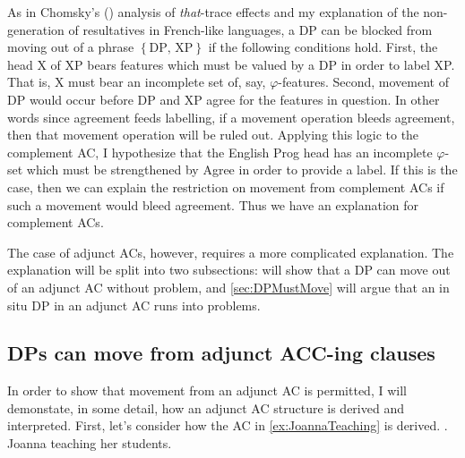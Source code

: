 \documentclass[MilwayThesis]{subfiles}
\begin{document}
As in Chomsky's (\citeyear{chomsky2015problems}) analysis of \textit{that}-trace effects and my explanation of the non-generation of resultatives in French-like languages, a DP can be blocked from moving out of a phrase $\left\{ \text{DP, XP} \right\}$ if the following conditions hold.
First, the head X of XP bears features which must be valued by a DP in order to label XP.
That is, X must bear an incomplete set of, say, $\varphi$-features.
Second, movement of DP would occur before DP and XP agree for the features in question.
In other words since agreement feeds labelling, if a movement operation bleeds agreement, then that movement operation will be ruled out.
Applying this logic to the complement AC, I hypothesize that the English Prog head has an incomplete $\varphi$-set which must be strengthened by Agree in order to provide a label.
If this is the case, then we can explain the restriction on movement from complement ACs if such a movement would bleed agreement.
Thus we have an explanation for complement ACs.

The case of adjunct ACs, however, requires a more complicated explanation.
The explanation will be split into two subsections:  will show that a DP can move out of an adjunct AC without problem, and \cref{sec:DPMustMove} will argue that an in situ DP in an adjunct AC runs into problems.

\subsection{DPs can move from adjunct ACC-ing clauses}\label{sec:DPCanMove}
In order to show that movement from an adjunct AC is permitted, I will demonstate, in some detail, how an adjunct AC structure is derived and interpreted.
First, let's consider how the AC in \cref{ex:JoannaTeaching} is derived.
\ex.\label{ex:JoannaTeaching} Joanna teaching her students.
\end{document}

